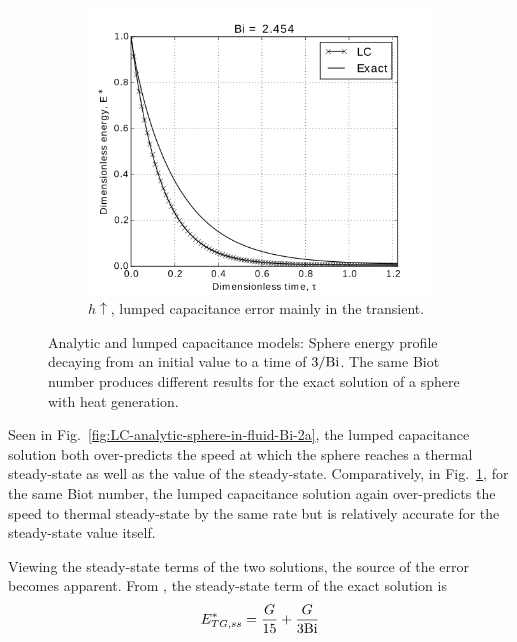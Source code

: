\begin{figure}
        \begin{subfigure}[b]{0.5\textwidth}
                \includegraphics[width=\textwidth]{figures/LC-analytic-sphere-in-fluid-Bi-2b}
                \caption{$h \uparrow$, lumped capacitance error mainly in the transient.}
				\label{fig:LC-analytic-sphere-in-fluid-Bi-2b}
        \end{subfigure}
        \caption[Analytic temperature profile for moderate Biot number]{Analytic and lumped capacitance models: Sphere energy profile decaying from an initial value to a time of $3/\mathrm{Bi}$. The same Biot number produces different results for the exact solution of a sphere with heat generation.}\label{fig:LC-analytic-sphere-in-fluid-Bi-2}
\end{figure}

Seen in Fig.~\ref{fig:LC-analytic-sphere-in-fluid-Bi-2a}, the lumped capacitance solution both over-predicts the speed at which the sphere reaches a thermal steady-state as well as the value of the steady-state. Comparatively, in Fig.~\ref{fig:LC-analytic-sphere-in-fluid-Bi-2b}, for the same Biot number, the lumped capacitance solution again over-predicts the speed to thermal steady-state by the same rate but is relatively accurate for the steady-state value itself. 

Viewing the steady-state terms of the two solutions, the source of the error becomes apparent. From , the steady-state term of the exact solution is
\begin{equation}
	E^*_{TG,ss}=\frac{G}{15}+\frac{G}{3\mathrm{Bi}}
\end{equation}


